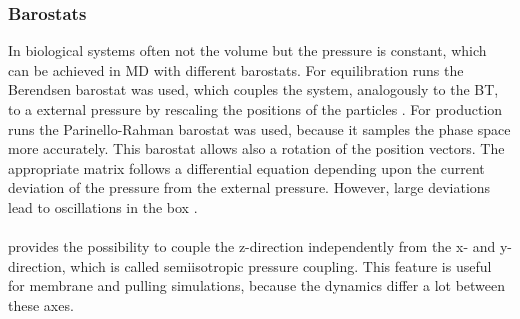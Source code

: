 \subsubsection{Barostats}
In biological systems often not the volume but the pressure is constant, which can be achieved in MD with different barostats. For equilibration runs the Berendsen barostat \autocite{berendsen} was used, which couples the system, analogously to the BT, to a external pressure by rescaling the positions of the particles \autocite[p. 36]{gromacsManual}. For production runs the Parinello-Rahman barostat \autocites{parinelloBarostat}{parinelloBarostat2} was used, because it samples the phase space more accurately. This barostat allows also a rotation of the position vectors. The appropriate matrix follows a differential equation depending upon the current deviation of the pressure from the external pressure. However, large deviations lead to oscillations in the box \autocite[p. 36]{gromacsManual}.\\
\\
\gromacs{} provides the possibility to couple the z-direction independently from the x- and y-direction, which is called semiisotropic pressure coupling. This feature is useful for membrane and pulling simulations, because the dynamics differ a lot between these axes.